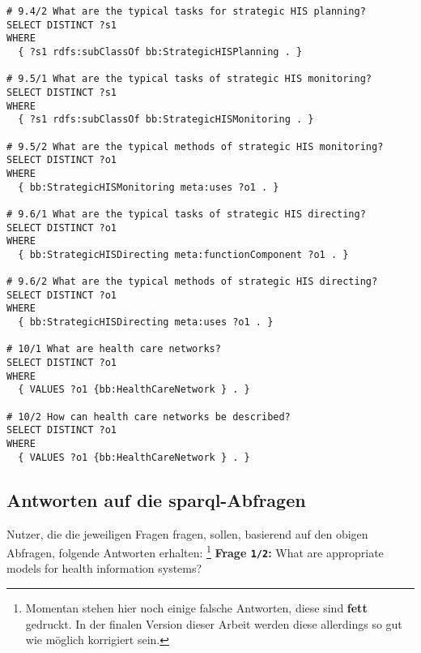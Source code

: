 \begin{lstlisting}[language=SPARQL]
# 9.4/2 What are the typical tasks for strategic HIS planning?
SELECT DISTINCT ?s1
WHERE
  { ?s1 rdfs:subClassOf bb:StrategicHISPlanning . }

# 9.5/1 What are the typical tasks of strategic HIS monitoring?
SELECT DISTINCT ?s1
WHERE
  { ?s1 rdfs:subClassOf bb:StrategicHISMonitoring . }

# 9.5/2 What are the typical methods of strategic HIS monitoring?
SELECT DISTINCT ?o1
WHERE
  { bb:StrategicHISMonitoring meta:uses ?o1 . }

# 9.6/1 What are the typical tasks of strategic HIS directing?
SELECT DISTINCT ?o1
WHERE
  { bb:StrategicHISDirecting meta:functionComponent ?o1 . }

# 9.6/2 What are the typical methods of strategic HIS directing?
SELECT DISTINCT ?o1
WHERE
  { bb:StrategicHISDirecting meta:uses ?o1 . }

# 10/1 What are health care networks?
SELECT DISTINCT ?o1
WHERE
  { VALUES ?o1 {bb:HealthCareNetwork } . }

# 10/2 How can health care networks be described?
SELECT DISTINCT ?o1
WHERE
  { VALUES ?o1 {bb:HealthCareNetwork } . }

\end{lstlisting}

\subsection[Antworten auf die SPARQL-Abfragen]{Antworten auf die \ac{sparql}-Abfragen}

Nutzer, die die jeweiligen Fragen fragen, sollen, basierend auf den obigen Abfragen, folgende Antworten erhalten:
\footnote{Momentan stehen hier noch einige falsche Antworten, diese sind \textbf{fett} gedruckt.
In der finalen Version dieser Arbeit werden diese allerdings so gut wie möglich korrigiert sein.}
\textbf{Frage \texttt{1/2}:} What are appropriate models for health information systems?

